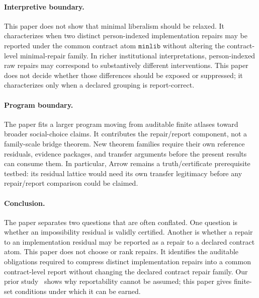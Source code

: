 \paragraph{Interpretive boundary.}
This paper does not show that minimal liberalism should be relaxed.  It characterizes
when two distinct person-indexed implementation repairs may be reported under
the common contract atom \(\mathtt{minlib}\) without altering the
contract-level minimal-repair family.  In richer institutional
interpretations, person-indexed raw repairs may correspond to substantively
different interventions.  This paper does not decide whether those differences should
be exposed or suppressed; it characterizes only when a declared grouping is
report-correct.

\paragraph{Program boundary.}
The paper fits a larger program moving from auditable finite atlases toward
broader social-choice claims.  It contributes the repair/report component, not
a family-scale bridge theorem.  New theorem families require their own
reference residuals, evidence packages, and transfer arguments before the
present results can consume them.  In particular, Arrow remains a truth/certificate prerequisite
testbed: its residual lattice would need its own transfer legitimacy before any
repair/report comparison could be claimed.

\paragraph{Conclusion.}
The paper separates two questions that are often conflated.  One question is
whether an impossibility residual is validly certified.  Another is whether a
repair to an implementation residual may be reported as a repair to a declared
contract atom.  This paper does not choose or rank repairs.  It identifies the
auditable obligations required to compress distinct implementation repairs into
a common contract-level report without changing the declared contract repair
family.  Our prior study~\citep{hayashida2026repair} shows why reportability
cannot be assumed; this paper gives finite-set conditions under which it can be
earned.
